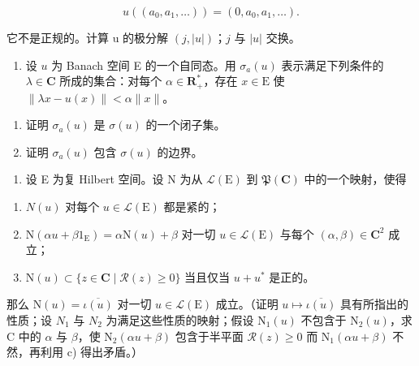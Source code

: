 \[
u ((a _ {0}, a _ {1}, \dots)) = (0, a _ {0}, a _ {1}, \dots).
\]

它不是正规的。计算 u 的极分解 \((j, |u|)\)；\(j\) 与 \(|u|\) 交换。

\begin{enumerate}
\def\labelenumi{\arabic{enumi})}
\setcounter{enumi}{11}
\tightlist
\item
  设 \(u\) 为 Banach 空间 E 的一个自同态。用 \(\sigma_{a}(u)\) 表示满足下列条件的 \(\lambda\in\mathbf{C}\) 所成的集合：对每个 \(\alpha\in\mathbf{R}_{+}^{*}\)，存在 \(x\in\mathrm{E}\) 使 \(\|\lambda x-u(x)\|<\alpha\|x\|\)。
\end{enumerate}

\begin{enumerate}
\def\labelenumi{\alph{enumi})}
\item
  证明 \(\sigma_{a}(u)\) 是 \(\sigma(u)\) 的一个闭子集。
\item
  证明 \(\sigma_{a}(u)\) 包含 \(\sigma(u)\) 的边界。
\end{enumerate}

\begin{enumerate}
\def\labelenumi{\arabic{enumi})}
\setcounter{enumi}{12}
\tightlist
\item
  设 E 为复 Hilbert 空间。设 N 为从 \(\mathcal{L}(\mathrm{E})\) 到 \(\mathfrak{P}(\mathbf{C})\) 中的一个映射，使得
\end{enumerate}

\begin{enumerate}
\def\labelenumi{\alph{enumi})}
\item
  \(N(u)\) 对每个 \(u \in \mathcal{L}(\mathrm{E})\) 都是紧的；
\item
  \(\mathrm{N}(\alpha u + \beta 1_{\mathrm{E}}) = \alpha \mathrm{N}(u) + \beta\) 对一切 \(u \in \mathcal{L}(\mathrm{E})\) 与每个 \((\alpha, \beta) \in \mathbf{C}^{2}\) 成立；
\item
  \(\mathrm{N}(u)\subset\{z\in\mathbf{C}\mid\mathcal{R}(z)\geqslant0\}\) 当且仅当 \(u+u^{*}\) 是正的。
\end{enumerate}

  那么 \(\mathrm{N}(u)=\overline{\iota(u)}\) 对一切 \(u\in\mathcal{L}(\mathrm{E})\) 成立。（证明 \(u\mapsto\overline{\iota(u)}\) 具有所指出的性质；设 \(N_{1}\) 与 \(N_{2}\) 为满足这些性质的映射；假设 \(\mathrm{N}_{1}(u)\) 不包含于 \(\mathrm{N}_{2}(u)\)，求 C 中的 \(\alpha\) 与 \(\beta\)，使 \(\mathrm{N}_{2}(\alpha u+\beta)\) 包含于半平面 \(\mathcal{R}(z)\geqslant0\) 而 \(\mathrm{N}_{1}(\alpha u+\beta)\) 不然，再利用 c) 得出矛盾。）

